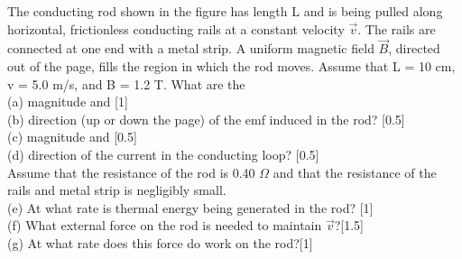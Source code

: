 \documentclass{article}
\begin{document}
The conducting rod shown in the figure has length L and is being pulled along horizontal, frictionless conducting rails at a constant velocity $\Vec{v}$. The rails are connected at one end 
with a metal strip. A uniform magnetic field $\vec{B}$, directed out of the page, fills the region in 
which the rod moves. Assume that L = 10 cm, 
v = 5.0 m/s, and B = 1.2 T. What are the\\ 
(a) magnitude and [1]\\
(b) direction (up or down the page) of the emf induced in the rod? [0.5]\\
(c) magnitude and [0.5]\\     
(d) direction of the current in the conducting loop? [0.5]\\
Assume that the resistance of the rod is 0.40 $\Omega$ and that the resistance of the rails and metal strip is negligibly small. \\
(e) At what rate is thermal energy being generated in the rod? [1]\\    
(f) What external force on the rod is needed to maintain $\vec{v}$?[1.5]\\  
(g) At what rate does this force do work on the rod?[1] 
\end{document}
